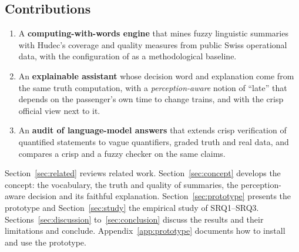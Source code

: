 \subsection{Contributions}
\label{sec:contributions}
\begin{enumerate}
  \item A \textbf{computing-with-words engine} that mines fuzzy linguistic summaries with
  Hudec's coverage and quality measures from public Swiss operational data, with the
  configuration of \citet{pincay2021} as a methodological baseline.
  \item An \textbf{explainable assistant} whose decision word and explanation come from the
  same truth computation, with a \emph{perception-aware} notion of ``late'' that depends on
  the passenger's own time to change trains, and with the crisp official view next to it.
  \item An \textbf{audit of language-model answers} that extends crisp verification of
  quantified statements \citep{eida2026} to vague quantifiers, graded truth and real data,
  and compares a crisp and a fuzzy checker on the same claims.
\end{enumerate}

Section~\ref{sec:related} reviews related work. Section~\ref{sec:concept} develops the
concept: the vocabulary, the truth and quality of summaries, the perception-aware decision
and its faithful explanation. Section~\ref{sec:prototype} presents the prototype and
Section~\ref{sec:study} the empirical study of SRQ1--SRQ3. Sections~\ref{sec:discussion}
to~\ref{sec:conclusion} discuss the results and their limitations and conclude.
Appendix~\ref{app:prototype} documents how to install and use the prototype.
